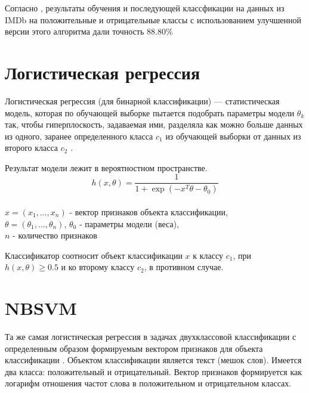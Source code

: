 Согласно \cite{Narayanan:naiveBayes}, результаты обучения и последующей классфикации на данных из IMDb \cite{imdb:data} на положительные и отрицательные классы с использованием улучшенной версии этого алгоритма дали точность 88.80\%
\section{Логистическая регрессия}
Логистическая регрессия (для бинарной классификации) --- статистическая модель, которая по обучающей выборке пытается подобрать параметры модели $\theta_k$ так, чтобы гиперплоскость, задаваемая ими, разделяла как можно больше данных из одного, заранее определенного класса $c_1$ из обучающей выборки  от данных из второго класса $c_2$ \cite{AndrewNg:logisticRegression}.

Результат модели лежит в вероятностном пространстве.
$$
h(x, \theta) = \frac{1}{1 + \exp(-x^T\theta -\theta_0)}
$$
\\
$x = (x_1, \ldots, x_n)$ - вектор признаков объекта классификации, \\
$\theta = (\theta_1, \ldots, \theta_n)$, $\theta_0$ - параметры модели (веса),
\\
$n$ - количество признаков

Классификатор соотносит объект классификации $x$ к классу $c_1$, при $h(x, \theta) \geq 0.5$ и ко второму классу $c_2$, в противном случае.


\section{NBSVM}
Та же самая логистическая регрессия в задачах двухклассовой классификации с определенным образом формируемым вектором признаков для объекта классификации \cite{nbsvm}. Объектом классификации является текст (мешок слов). Имеется два класса: положительный и отрицательный. Вектор признаков формируется как логарифм отношения частот слова в положительном и отрицательном классах.